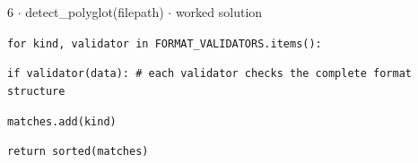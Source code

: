 \documentclass[11pt]{article}
\begin{document}
\begin{keepsection}
\begin{workedbox}{6 \ensuremath{\cdot} detect\_polyglot(filepath) \ensuremath{\cdot} worked solution}
\begin{enumerate}
\begin{tcolorbox}[colback=Paperblue,colframe=Paperblue,boxrule=0pt,arc=0pt,left=7pt,right=7pt,top=5pt,bottom=5pt]
\noindent\hspace*{1em}\texttt{for kind, validator in FORMAT\_VALIDATORS.items():}\par
\noindent\hspace*{3em}\texttt{if validator(data): \# each validator checks the complete format structure}\par
\noindent\hspace*{5em}\texttt{matches.add(kind)}\par
\noindent\hspace*{1em}\texttt{return sorted(matches)}\par
\end{tcolorbox}
\end{enumerate}
\end{workedbox}

\end{keepsection}
\end{document}
